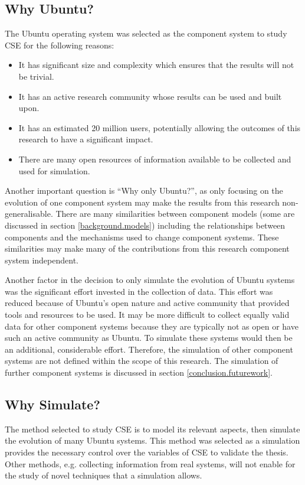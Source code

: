 \subsection{Why Ubuntu?}
The Ubuntu operating system was selected as the component system to study CSE for the following reasons:
\begin{itemize}
  \item It has significant size and complexity which ensures that the results will not be trivial.
  \item It has an active research community whose results can be used and built upon.
  \item It has an estimated 20 million users, potentially allowing the outcomes of this research to have a significant impact.
  \item There are many open resources of information available to be collected and used for simulation.
\end{itemize} 

Another important question is ``Why only Ubuntu?'', 
as only focusing on the evolution of one component system may make the results from this research non-generalisable.
There are many similarities between component models (some are discussed in section \ref{background.models})
including the relationships between components and the mechanisms used to change component systems.
These similarities may make many of the contributions from this research component system independent.

Another factor in the decision to only simulate the evolution of Ubuntu systems was the significant effort invested in the collection of data.
This effort was reduced because of Ubuntu's open nature and active community that provided tools and resources to be used.
It may be more difficult to collect equally valid data for other component systems because they are typically not as open or have such an active community as Ubuntu.
To simulate these systems would then be an additional, considerable effort.
Therefore, the simulation of other component systems are not defined within the scope of this research.
The simulation of further component systems is discussed in section \ref{conclusion.futurework}.

\subsection{Why Simulate?}
The method selected to study CSE is to model its relevant aspects, then simulate the evolution of many Ubuntu systems.
This method was selected as a simulation provides the necessary control over the variables of CSE to validate the thesis.
Other methods, e.g. collecting information from real systems, will not enable for the study of novel techniques that a simulation allows.

